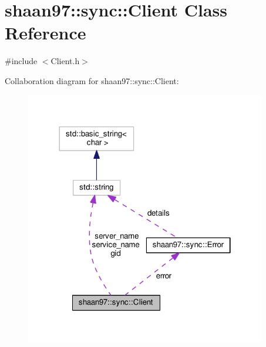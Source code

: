 \hypertarget{classshaan97_1_1sync_1_1_client}{}\section{shaan97\+:\+:sync\+:\+:Client Class Reference}
\label{classshaan97_1_1sync_1_1_client}


{\ttfamily \#include $<$Client.\+h$>$}



Collaboration diagram for shaan97\+:\+:sync\+:\+:Client\+:\nopagebreak
\begin{figure}[H]
\begin{center}
\leavevmode
\includegraphics[width=298pt]{classshaan97_1_1sync_1_1_client__coll__graph}
\end{center}
\end{figure}

